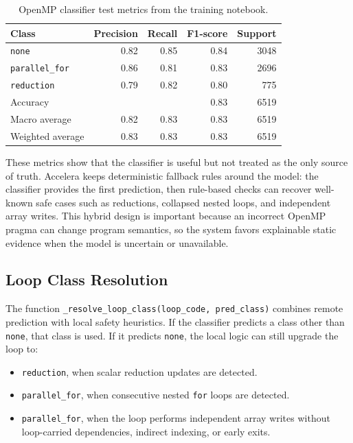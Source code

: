 \documentclass[11pt,a4paper]{article}
\begin{document}
\begin{table}[H]
  \centering
  \caption{OpenMP classifier test metrics from the training notebook.}
  \label{tab:openmp-classifier-metrics}
  \begin{tabular}{lrrrr}
    \toprule
    Class & Precision & Recall & F1-score & Support \\
    \midrule
    \texttt{none} & 0.82 & 0.85 & 0.84 & 3048 \\
    \texttt{parallel\_for} & 0.86 & 0.81 & 0.83 & 2696 \\
    \texttt{reduction} & 0.79 & 0.82 & 0.80 & 775 \\
    \midrule
    Accuracy & \multicolumn{3}{r}{0.83} & 6519 \\
    Macro average & 0.82 & 0.83 & 0.83 & 6519 \\
    Weighted average & 0.83 & 0.83 & 0.83 & 6519 \\
    \bottomrule
  \end{tabular}
\end{table}

These metrics show that the classifier is useful but not treated as the only
source of truth. Accelera keeps deterministic fallback rules around the model:
the classifier provides the first prediction, then rule-based checks can recover
well-known safe cases such as reductions, collapsed nested loops, and
independent array writes. This hybrid design is important because an incorrect
OpenMP pragma can change program semantics, so the system favors explainable
static evidence when the model is uncertain or unavailable.

\subsection{Loop Class Resolution}

The function \texttt{\_resolve\_loop\_class(loop\_code, pred\_class)} combines
remote prediction with local safety heuristics. If the classifier predicts a
class other than \texttt{none}, that class is used. If it predicts
\texttt{none}, the local logic can still upgrade the loop to:

\begin{itemize}[leftmargin=*]
  \item \texttt{reduction}, when scalar reduction updates are detected.
  \item \texttt{parallel\_for}, when consecutive nested \texttt{for} loops are
        detected.
  \item \texttt{parallel\_for}, when the loop performs independent array writes
        without loop-carried dependencies, indirect indexing, or early exits.
\end{itemize}
\end{document}
